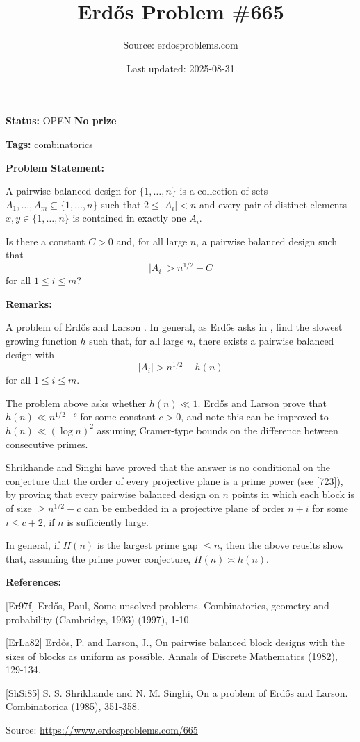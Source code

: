 \documentclass{article}
\title{Erd\H{o}s Problem \#665}
\date{Last updated: 2025-08-31}
\author{Source: erdosproblems.com}
\begin{document}
\maketitle

\noindent\textbf{Status:} OPEN \quad \textbf{No prize}

\noindent\textbf{Tags:} combinatorics

\medskip
\noindent\textbf{Problem Statement:}

A pairwise balanced design for $\{1,\ldots,n\}$ is a collection of sets $A_1,\ldots,A_m\subseteq \{1,\ldots,n\}$ such that $2\leq \lvert A_i\rvert <n$ and every pair of distinct elements $x,y\in \{1,\ldots,n\}$ is contained in exactly one $A_i$.

Is there a constant $C>0$ and, for all large $n$, a pairwise balanced design such that\[\lvert A_i\rvert > n^{1/2}-C\]for all $1\leq i\leq m$?

\bigskip
\noindent\textbf{Remarks:}

A problem of Erd\H{o}s and Larson \cite{ErLa82}. In general, as Erd\H{o}s asks in \cite{Er97f}, find the slowest growing function $h$ such that, for all large $n$, there exists a pairwise balanced design with\[\lvert A_i\rvert > n^{1/2}-h(n)\]for all $1\leq i\leq m$.

The problem above asks whether $h(n)\ll 1$. Erd\H{o}s and Larson prove that $h(n) \ll n^{1/2-c}$ for some constant $c>0$, and note this can be improved to $h(n)\ll (\log n)^2$ assuming Cramer-type bounds on the difference between consecutive primes.

Shrikhande and Singhi \cite{ShSi85} have proved that the answer is no conditional on the conjecture that the order of every projective plane is a prime power (see [723]), by proving that every pairwise balanced design on $n$ points in which each block is of size $\geq n^{1/2}-c$ can be embedded in a projective plane of order $n+i$ for some $i\leq c+2$, if $n$ is sufficiently large.

In general, if $H(n)$ is the largest prime gap $\leq n$, then the above reuslts show that, assuming the prime power conjecture, $H(n)\asymp h(n)$.

\bigskip
\noindent\textbf{References:}

[Er97f] Erd\H{o}s, Paul, Some unsolved problems. Combinatorics, geometry and probability (Cambridge, 1993) (1997), 1-10.
 
 [ErLa82] Erd\H{o}s, P. and Larson, J., On pairwise balanced block designs with the sizes of blocks as uniform as possible. Annals of Discrete Mathematics (1982), 129-134.
 
 [ShSi85] S. S. Shrikhande and N. M. Singhi, On a problem of Erd\H{o}s and Larson. Combinatorica (1985), 351-358.

\bigskip
\noindent\small{Source: \url{https://www.erdosproblems.com/665}}
\end{document}
